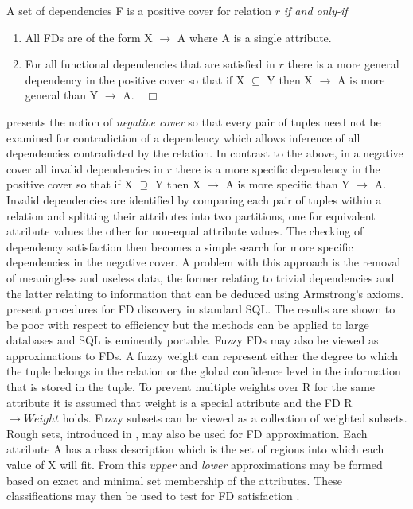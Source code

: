 \begin{definition}
\begin{rm}
A set of dependencies F is a positive cover for relation $r$ {\em if and
only-if}
\begin{enumerate}
\item All FDs are of the form X $\to$ A where A is
a single attribute.
\item For all functional dependencies that are satisfied in $r$ there is a
more general dependency in the positive cover so that if X $\subseteq$
Y then X $\rightarrow$ A is more general than Y $\rightarrow$ A.$\quad\Box$
\end{enumerate}
\end{rm}
\end{definition}

\cite{sf93} presents the notion of {\em negative cover} so that every pair
of tuples need not be examined for contradiction of a dependency which
allows inference of all dependencies contradicted by the relation.
In contrast to the above, in a negative cover all invalid dependencies
in $r$ there is a more specific dependency in the positive cover so that
if X $\supseteq$ Y then X $\rightarrow$ A is  more specific than Y
$\rightarrow$ A. Invalid dependencies are identified by comparing each
pair of tuples 
within a relation and splitting their attributes into two partitions,
one for equivalent attribute values the other for non-equal attribute
values.  The checking of dependency satisfaction then becomes a simple
search for more specific dependencies in the negative cover. A problem
with this approach is the removal of meaningless and useless data, the
former relating to trivial dependencies and the latter relating to
information  that can be deduced using Armstrong's axioms.
\cite{bb95} present procedures for FD discovery in standard SQL. The
results are shown to be poor with respect to efficiency but the
methods can be applied to large databases and SQL is eminently portable.
\smallskip
{}
Fuzzy FDs \cite{bdp94,hfs94} may also be viewed as approximations to FDs.
A fuzzy weight can represent either the degree to which the tuple
belongs in the relation or the global confidence level in the
information that is stored in the tuple. To prevent multiple weights
over R for the same attribute it is assumed that weight is a special
attribute and the FD R $\to Weight$ holds.  Fuzzy subsets can be
viewed as a collection of weighted subsets. Rough sets, introduced in
\cite{wz86}, may also be used for FD approximation. Each attribute A
has a class description which is the set of regions into which
each value of X will fit. From this {\em upper} and {\em lower}
approximations may be formed based on exact and minimal set membership
of the attributes. These classifications may then be used to test for
FD satisfaction \cite{bpb95}.


